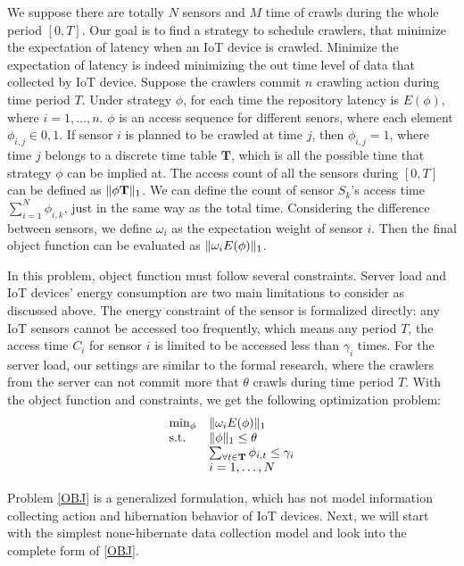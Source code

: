 \documentclass[conference]{IEEEtran}
\begin{document}
We suppose there are totally $N$ sensors and $M$ time of crawls during the whole period $[0, T]$. Our goal is to find a strategy to schedule crawlers, that minimize the expectation of latency when an IoT device is crawled. 
Minimize the expectation of latency is indeed minimizing the out time level of data that collected by IoT device. Suppose the crawlers commit $n$ crawling action during time period $T$. 
Under strategy $\phi$, for each time the repository latency is $E(\phi)$, where $i=1,\ldots,n$. 
$\phi$ is an access sequence for different senors, where each element $\phi_{i,j}\in{0,1}$. 
If sensor $i$ is planned to be crawled at time $j$, then $\phi_{i,j}=1$, where time $j$ belongs to a discrete time table $\mathbf{T}$, which is all the possible time that strategy $\phi$ can be implied at.
The access count of all the sensors during $[0, T]$ can be defined as $\Arrowvert\phi\mathbf{T} \Arrowvert_{1}$. We can define the count of sensor $S_k$'s access time $\sum_{i=1}^{N}\phi_{i,k}$, just in the same way as the total time. 
Considering the difference between sensors, we define $\omega_i$ as the expectation weight of sensor $i$. Then the final object function can be evaluated as $\Arrowvert \omega_i E(\phi) \Arrowvert_{1}$.


In this problem, object function must follow several constraints. Server load and IoT devices' energy consumption are two main limitations to consider as discussed above. 
The energy constraint of the sensor is formalized directly: any IoT sensors cannot be accessed too frequently, which means any period $T$, the access time $C_i$ for sensor $i$ is limited to be accessed less than $\gamma_i$ times. For the server load, our settings are similar to the formal research\cite{Wolf2002}, where the crawlers from the server can not commit more that $\theta$ crawls during time period $T$.
With the object function and constraints, we get the following optimization problem:
\begin{eqnarray}
\begin{array}{ll}
\min_{\phi}&\Arrowvert \omega_i E(\phi) \Arrowvert_{1}\\
\text{s.t.} 
&\Arrowvert \phi \Arrowvert_{1}\leq\theta\\
&\sum_{\forall t \in \mathbf{T}}{\phi_{i,t}}\leq\gamma_i\\
&i=1,\ldots,N
\end{array}\label{OBJ}
\end{eqnarray}


Problem \eqref{OBJ} is a generalized formulation, which has not model information collecting action and hibernation behavior of IoT devices. Next, we will start with the simplest none-hibernate data collection model and look into the complete form of \eqref{OBJ}.
\end{document}
